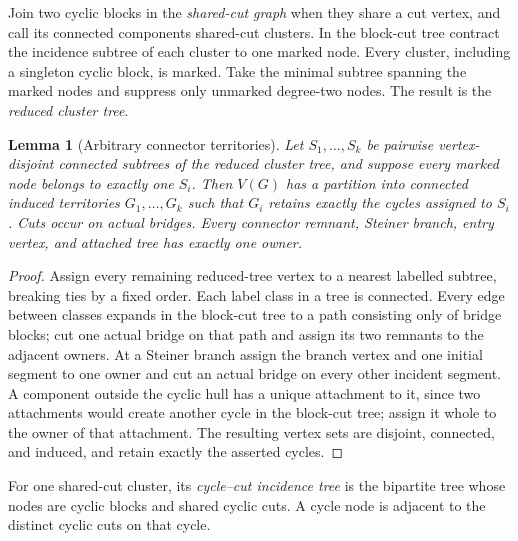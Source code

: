 \documentclass[11pt]{article}
\newtheorem{lemma}[theorem]{Lemma}
\begin{document}
Join two cyclic blocks in the \emph{shared-cut graph} when they share a cut
vertex, and call its connected components shared-cut clusters.  In the
block-cut tree contract the incidence subtree of each cluster to one marked
node.  Every cluster, including a singleton cyclic block, is marked.  Take the
minimal subtree spanning the marked nodes and suppress only unmarked
degree-two nodes.  The result is the \emph{reduced cluster tree}.

\begin{lemma}[Arbitrary connector territories]\label{lem:territories}
Let $S_1,\ldots,S_k$ be pairwise vertex-disjoint connected subtrees of the
reduced cluster tree, and suppose every marked node belongs to exactly one
$S_i$.  Then $V(G)$ has a partition into connected induced territories
$G_1,\ldots,G_k$ such that $G_i$ retains exactly the cycles assigned to $S_i$.
Cuts occur on actual bridges.  Every connector remnant, Steiner branch, entry
vertex, and attached tree has exactly one owner.
\end{lemma}

\begin{proof}
Assign every remaining reduced-tree vertex to a nearest labelled subtree,
breaking ties by a fixed order.  Each label class in a tree is connected.
Every edge between classes expands in the block-cut tree to a path consisting
only of bridge blocks; cut one actual bridge on that path and assign its two
remnants to the adjacent owners.  At a Steiner branch assign the branch vertex
and one initial segment to one owner and cut an actual bridge on every other
incident segment.  A component outside the cyclic hull has a unique attachment
to it, since two attachments would create another cycle in the block-cut tree;
assign it whole to the owner of that attachment.  The resulting vertex sets
are disjoint, connected, and induced, and retain exactly the asserted cycles.
\end{proof}

For one shared-cut cluster, its \emph{cycle--cut incidence tree} is the
bipartite tree whose nodes are cyclic blocks and shared cyclic cuts.  A cycle
node is adjacent to the distinct cyclic cuts on that cycle.
\end{document}

